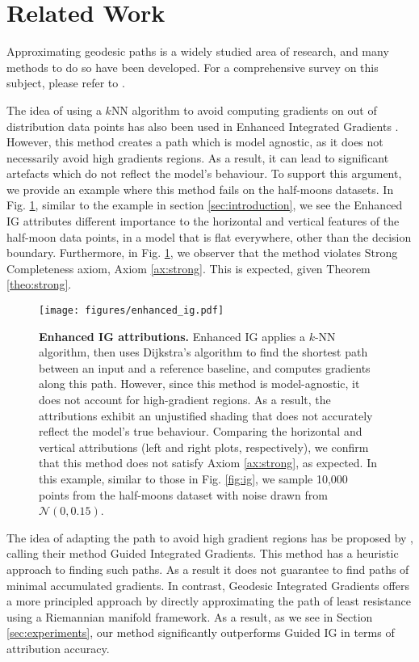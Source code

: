 \section{Related Work}
\label{sec:related_work}

Approximating geodesic paths is a widely studied area of research, and many methods to do so have been developed. For a comprehensive survey on this subject, please refer to \citet{crane2020survey}.

The idea of using a $k$NN algorithm to avoid computing gradients on out of distribution data points has also been used in Enhanced Integrated Gradients \citet{jha2020enhanced}. However, this method creates a path which is model agnostic, as it does not necessarily avoid high gradients regions. As a result, it can lead to significant artefacts which do not reflect the model's behaviour. To support this argument, we provide an example where this method fails on the half-moons datasets. In Fig. \ref{fig:enhanced_ig}, similar to the example in section \ref{sec:introduction}, we see the Enhanced IG attributes different importance to the horizontal and vertical features of the half-moon data points, in a model that is flat everywhere, other than the decision boundary. Furthermore, in Fig. \ref{fig:enhanced_ig}, we observer that the method violates Strong Completeness axiom, Axiom \ref{ax:strong}. This is expected, given Theorem \ref{theo:strong}.

\begin{figure}[t]
\vskip -0.2in
\begin{center}
\centerline{\texttt{[image: figures/enhanced\_ig.pdf]}}
\caption{\textbf{Enhanced IG attributions.} Enhanced IG applies a $k$-NN algorithm, then uses Dijkstra’s algorithm to find the shortest path between an input and a reference baseline, and computes gradients along this path. However, since this method is model-agnostic, it does not account for high-gradient regions. As a result, the attributions exhibit an unjustified shading that does not accurately reflect the model's true behaviour. Comparing the horizontal and vertical attributions (left and right plots, respectively), we confirm that this method does not satisfy Axiom \ref{ax:strong}, as expected. In this example, similar to those in Fig. \ref{fig:ig}, we sample 10,000 points from the half-moons dataset with noise drawn from  $\mathcal{N}(0, 0.15)$.}
\label{fig:enhanced_ig}
\end{center}
\vskip -0.2in
\end{figure}

The idea of adapting the path to avoid high gradient regions has be proposed by \citet{kapishnikov2021guided}, calling their method Guided Integrated Gradients. This method has a heuristic approach to finding such paths. As a result it does not guarantee to find paths of minimal accumulated gradients. In contrast, Geodesic Integrated Gradients offers a more principled approach by directly approximating the path of least resistance using a Riemannian manifold framework. As a result, as we see in Section \ref{sec:experiments}, our method significantly outperforms Guided IG in terms of attribution accuracy.